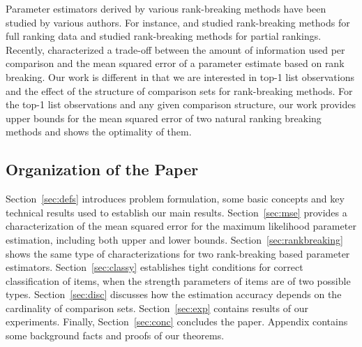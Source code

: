 Parameter estimators derived by various rank-breaking methods have been studied by various authors. For instance, \cite{soufiani2013generalized} and \cite{soufiani14} studied rank-breaking methods for full ranking data and \cite{khetan2016data} studied rank-breaking methods for partial rankings. Recently, \cite{khetan2016} characterized a trade-off between the amount of information used per comparison and the mean squared error of a parameter estimate based on rank breaking. Our work is different in that we are interested in top-1 list observations and the effect of the structure of comparison sets for rank-breaking methods. For the top-1 list observations and any given comparison structure, our work provides upper bounds for the mean squared error of two natural ranking breaking methods and shows the optimality of them.


\subsection{Organization of the Paper}

Section~\ref{sec:defs} introduces problem formulation, some basic concepts and key technical results used to establish our main results. Section~\ref{sec:mse} provides a characterization of the mean squared error for the maximum likelihood parameter estimation, including both upper and lower bounds. Section~\ref{sec:rankbreaking} shows the same type of characterizations for two rank-breaking based parameter estimators. Section~\ref{sec:classy} establishes tight conditions for correct classification of items, when the strength parameters of items are of two possible types. Section~\ref{sec:disc} discusses how the estimation accuracy depends on the cardinality of comparison sets. Section~\ref{sec:exp} contains results of our experiments. Finally, Section~\ref{sec:conc} concludes the paper. Appendix contains some background facts and proofs of our theorems.
